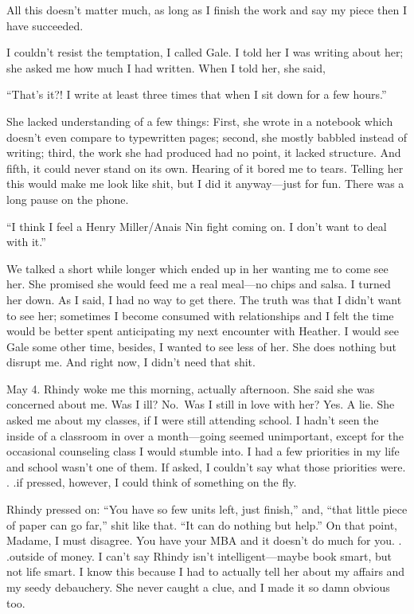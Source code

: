 All this doesn't matter much, as long as I finish the work and say my
piece then I have succeeded.

I couldn't resist the temptation, I called Gale. I told her I was
writing about her; she asked me how much I had written. When I told her,
she said,

``That's it?! I write at least three times that when I sit down for a
few hours.''

She lacked understanding of a few things: First, she wrote in a notebook
which doesn't even compare to typewritten pages; second, she mostly
babbled instead of writing; third, the work she had produced had no
point, it lacked structure. And fifth, it could never stand on its own.
Hearing of it bored me to tears. Telling her this would make me look
like shit, but I did it anyway---just for fun. There was a long pause on
the phone.

``I think I feel a Henry Miller/Anais Nin fight coming on. I don't want
to deal with it.''

We talked a short while longer which ended up in her wanting me to come
see her. She promised she would feed me a real meal---no chips and
salsa. I turned her down. As I said, I had no way to get there. The
truth was that I didn't want to see her; sometimes I become consumed
with relationships and I felt the time would be better spent
anticipating my next encounter with Heather. I would see Gale some other
time, besides, I wanted to see less of her. She does nothing but disrupt
me. And right now, I didn't need that shit.

May 4. Rhindy woke me this morning, actually afternoon. She said she was
concerned about me. Was I ill? No.~Was I still in love with her? Yes. A
lie. She asked me about my classes, if I were still attending school. I
hadn't seen the inside of a classroom in over a month---going seemed
unimportant, except for the occasional counseling class I would stumble
into. I had a few priorities in my life and school wasn't one of them.
If asked, I couldn't say what those priorities were. . .if pressed,
however, I could think of something on the fly.

Rhindy pressed on: ``You have so few units left, just finish,'' and,
``that little piece of paper can go far,'' shit like that. ``It can do
nothing but help.'' On that point, Madame, I must disagree. You have
your MBA and it doesn't do much for you. . .outside of money. I can't
say Rhindy isn't intelligent---maybe book smart, but not life smart. I
know this because I had to actually tell her about my affairs and my
seedy debauchery. She never caught a clue, and I made it so damn obvious
too.

